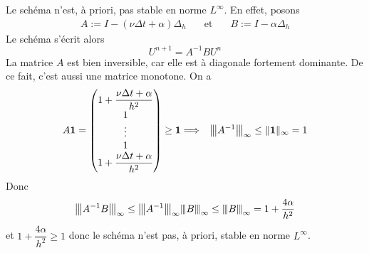 \begin{remark}
    Le schéma n'est, à priori, pas stable en norme $L^\infty$. En effet, posons 
    \begin{eqnarray*}
        A:=I-(\nu \Delta t+\alpha)\Delta_h \ \ \ &\text{ et }& \ \ \ B := I- \alpha \Delta_h 
    \end{eqnarray*}
    Le schéma s'écrit alors 
    \begin{equation*}
        U^{n+1} = A^{-1}B U^n
    \end{equation*}
    La matrice $A$ est bien inversible, car elle est à diagonale fortement dominante. De ce fait, c'est aussi une matrice monotone. On a 
    \begin{eqnarray*}
        A\bm{\mathrm{1}} = \begin{pmatrix}
            1+\dfrac{\nu \Delta t+\alpha}{h^2} \\
            1 \\
            \vdots \\
            1 \\
            1+\dfrac{\nu \Delta t+\alpha}{h^2}
        \end{pmatrix} \geq \bm{\mathrm{1}} &\Longrightarrow& {\left\vert\kern-0.25ex\left\vert \kern-0.25ex\left\vert A^{-1} \right\vert\kern-0.25ex\right\vert\kern-0.25ex\right\vert}_{\infty} \leq \| \bm{\mathrm{1}}\|_{\infty} = 1
    \end{eqnarray*}
    Donc 
    \begin{equation*}
        {\left\vert\kern-0.25ex\left\vert \kern-0.25ex\left\vert A^{-1}B \right\vert\kern-0.25ex\right\vert\kern-0.25ex\right\vert}_{\infty} \leq {\left\vert\kern-0.25ex\left\vert \kern-0.25ex\left\vert A^{-1} \right\vert\kern-0.25ex\right\vert\kern-0.25ex\right\vert}_{\infty} {\left\vert\kern-0.25ex\left\vert \kern-0.25ex\left\vert B \right\vert\kern-0.25ex\right\vert\kern-0.25ex\right\vert}_{\infty} \leq {\left\vert\kern-0.25ex\left\vert \kern-0.25ex\left\vert B \right\vert\kern-0.25ex\right\vert\kern-0.25ex\right\vert}_{\infty} = 1 + \frac{4\alpha}{h^2}
    \end{equation*}
    et $1 + \dfrac{4\alpha}{h^2} \geq 1$ donc le schéma n'est pas, à priori, stable en norme $L^{\infty}$.
\end{remark}

